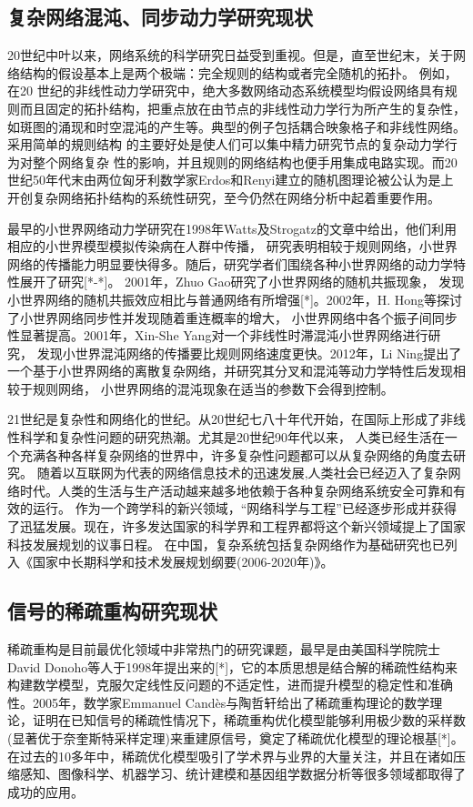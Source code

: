 \subsection{复杂网络混沌、同步动力学研究现状}
20世纪中叶以来，网络系统的科学研究日益受到重视。但是，直至世纪末，关于网络结构的假设基本上是两个极端：完全规则的结构或者完全随机的拓扑。
例如，在20 世纪的非线性动力学研究中，绝大多数网络动态系统模型均假设网络具有规则而且固定的拓扑结构，把重点放在由节点的非线性动力学行为所产生的复杂性，
如斑图的涌现和时空混沌的产生等。典型的例子包括耦合映象格子和非线性网络。采用简单的規则结构 的主要好处是使人们可以集中精力研究节点的复杂动力学行为对整个网络复杂
性的影响，并且规则的网络结构也便手用集成电路实现。而20世纪50年代末由两位匈牙利数学家Erdos和Renyi建立的随机图理论被公认为是上开创复杂网络拓扑结构的系统性研究，至今仍然在网络分析中起着重要作用。\par
最早的小世界网络动力学研究在1998年Watts及Strogatz的文章中给出，他们利用相应的小世界模型模拟传染病在人群中传播，
研究表明相较于规则网络，小世界网络的传播能力明显要快得多。随后，研究学者们围绕各种小世界网络的动力学特性展开了研究[*-*]。
2001年，Zhuo Gao研究了小世界网络的随机共振现象，
发现小世界网络的随机共振效应相比与普通网络有所增强[*]。2002年，H. Hong等探讨了小世界网络同步性并发现随着重连概率的增大，
小世界网络中各个振子间同步性显著提高。2001年，Xin-She Yang对一个非线性时滞混沌小世界网络进行研究，
发现小世界混沌网络的传播要比规则网络速度更快。2012年，Li Ning提出了一个基于小世界网络的离散复杂网络，并研究其分叉和混沌等动力学特性后发现相较于规则网络，
小世界网络的混沌现象在适当的参数下会得到控制。\par
21世纪是复杂性和网络化的世纪。从20世纪七八十年代开始，在国际上形成了非线性科学和复杂性问题的研究热潮。尤其是20世纪90年代以来，
人类已经生活在一个充满各种各样复杂网络的世界中，许多复杂性问题都可以从复杂网络的角度去研究。
随着以互联网为代表的网络信息技术的迅速发展,人类社会已经迈入了复杂网络时代。人类的生活与生产活动越来越多地依赖于各种复杂网络系统安全可靠和有效的运行。
作为一个跨学科的新兴领域，“网络科学与工程”已经逐步形成并获得了迅猛发展。现在，许多发达国家的科学界和工程界都将这个新兴领域提上了国家科技发展规划的议事日程。
在中国，复杂系统包括复杂网络作为基础研究也已列入《国家中长期科学和技术发展规划纲要(2006-2020年)》。
\subsection{信号的稀疏重构研究现状}
稀疏重构是目前最优化领域中非常热门的研究课题，最早是由美国科学院院士David Donoho等人于1998年提出来的[*]，它的本质思想是结合解的稀疏性结构来构建数学模型，克服欠定线性反问题的不适定性，进而提升模型的稳定性和准确性。2005年，数学家Emmanuel Candès与陶哲轩给出了稀疏重构理论的数学理论，证明在已知信号的稀疏性情况下，稀疏重构优化模型能够利用极少数的采样数(显著优于奈奎斯特采样定理)来重建原信号，奠定了稀疏优化模型的理论根基[*]。在过去的10多年中，稀疏优化模型吸引了学术界与业界的大量关注，并且在诸如压缩感知、图像科学、机器学习、统计建模和基因组学数据分析等很多领域都取得了成功的应用。

